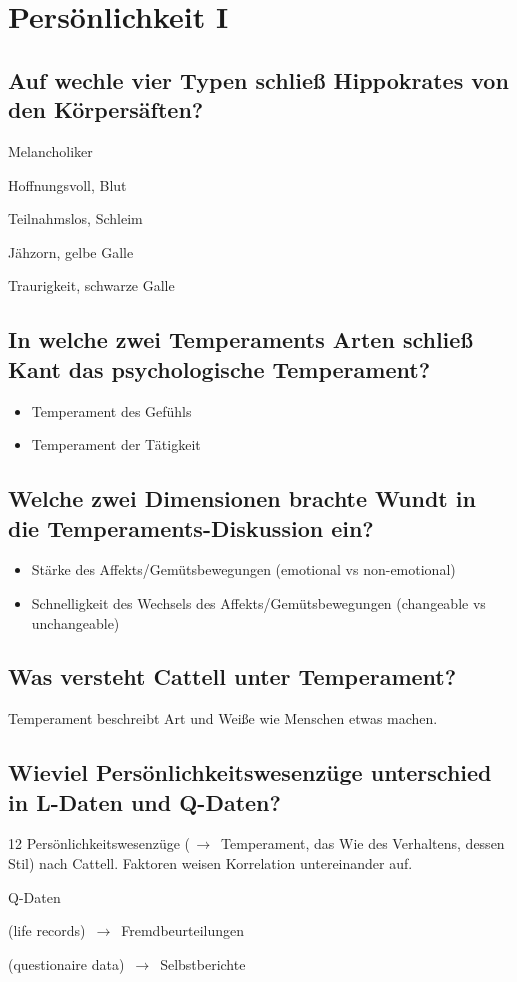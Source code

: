 \documentclass[a6paper,9pt,DIV=14]{scrartcl}
\begin{document}
\section{Persönlichkeit I}
\subsection{Auf wechle vier Typen schließ Hippokrates von den Körpersäften?}
    \begin{labeling}{Melancholiker}
        \item [Sanguiniker] Hoffnungsvoll, Blut
        \item [Phlegmatiker] Teilnahmslos, Schleim
        \item [Choleriker] Jähzorn, gelbe Galle
        \item [Melancholiker] Traurigkeit, schwarze Galle
    \end{labeling}
\subsection{In welche zwei Temperaments Arten schließ Kant das psychologische Temperament?}
    \begin{itemize}
        \item Temperament des Gefühls
        \item Temperament der Tätigkeit
    \end{itemize}
\subsection{Welche zwei Dimensionen brachte Wundt in die Temperaments-Diskussion ein?}
    \begin{itemize}
        \item Stärke des Affekts/Gemütsbewegungen (emotional vs non-emotional)
        \item Schnelligkeit des Wechsels des Affekts/Gemütsbewegungen (changeable vs unchangeable)
    \end{itemize}
\subsection{Was versteht Cattell unter Temperament?} %
    Temperament beschreibt Art und Weiße wie Menschen etwas machen.
\subsection{Wieviel Persönlichkeitswesenzüge unterschied in L-Daten und Q-Daten?} %
12 Persönlichkeitswesenzüge ($\,\to\,$ Temperament, das Wie des Verhaltens, dessen Stil) nach Cattell. Faktoren weisen Korrelation untereinander auf.
    \begin{labeling}{Q-Daten}
        \item [L-Daten] (life records) $\,\to\,$ Fremdbeurteilungen
        \item [Q-Daten] (questionaire data) $\,\to\,$ Selbstberichte
    \end{labeling}
\end{document}
